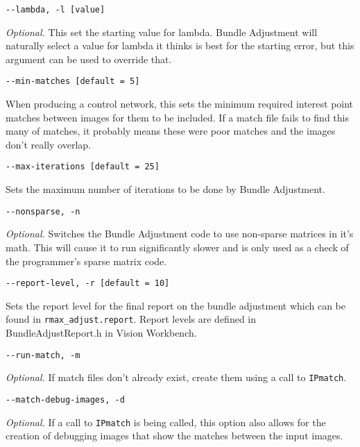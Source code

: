 \begin{verbatim}
--lambda, -l [value]
\end{verbatim}

\emph{Optional.} This set the starting value for lambda. Bundle
Adjustment will naturally select a value for lambda it thinks is best
for the starting error, but this argument can be used to override
that.

\begin{verbatim}
--min-matches [default = 5]
\end{verbatim}

When producing a control network, this sets the minimum required
interest point matches between images for them to be included. If a
match file fails to find this many of matches, it probably means these
were poor matches and the images don't really overlap.

\begin{verbatim}
--max-iterations [default = 25]
\end{verbatim}

Sets the maximum number of iterations to be done by Bundle Adjustment.

\begin{verbatim}
--nonsparse, -n
\end{verbatim}

\emph{Optional.} Switches the Bundle Adjustment code to use non-sparse
matrices in it's math. This will cause it to run significantly slower
and is only used as a check of the programmer's sparse matrix code.

\begin{verbatim}
--report-level, -r [default = 10]
\end{verbatim}

Sets the report level for the final report on the bundle adjustment
which can be found in \verb=rmax_adjust.report=. Report levels are defined in
BundleAdjustReport.h in Vision Workbench.

\begin{verbatim}
--run-match, -m
\end{verbatim}

\emph{Optional.} If match files don't already exist, create them using a
call to \texttt{IPmatch}.

\begin{verbatim}
--match-debug-images, -d
\end{verbatim}

\emph{Optional.} If a call to \texttt{IPmatch} is being called, this option
also allows for the creation of debugging images that show the matches
between the input images.

